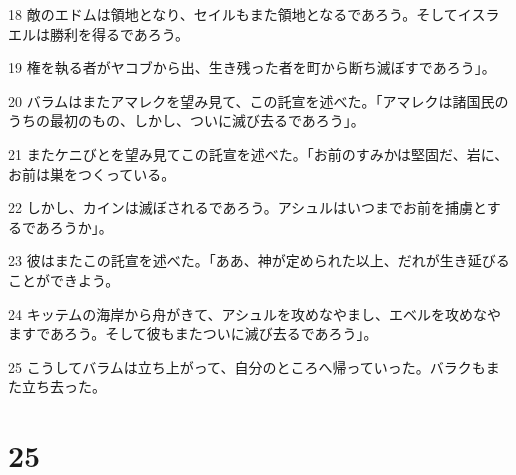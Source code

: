\par 18 敵のエドムは領地となり、セイルもまた領地となるであろう。そしてイスラエルは勝利を得るであろう。
\par 19 権を執る者がヤコブから出、生き残った者を町から断ち滅ぼすであろう」。
\par 20 バラムはまたアマレクを望み見て、この託宣を述べた。「アマレクは諸国民のうちの最初のもの、しかし、ついに滅び去るであろう」。
\par 21 またケニびとを望み見てこの託宣を述べた。「お前のすみかは堅固だ、岩に、お前は巣をつくっている。
\par 22 しかし、カインは滅ぼされるであろう。アシュルはいつまでお前を捕虜とするであろうか」。
\par 23 彼はまたこの託宣を述べた。「ああ、神が定められた以上、だれが生き延びることができよう。
\par 24 キッテムの海岸から舟がきて、アシュルを攻めなやまし、エベルを攻めなやますであろう。そして彼もまたついに滅び去るであろう」。
\par 25 こうしてバラムは立ち上がって、自分のところへ帰っていった。バラクもまた立ち去った。

\chapter{25}

